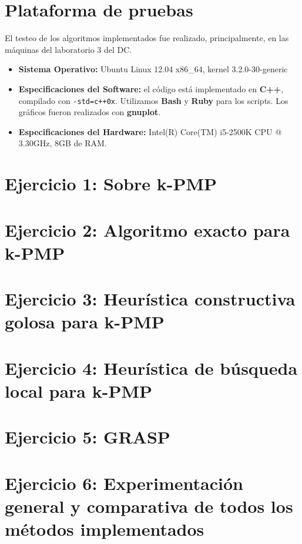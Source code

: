 \documentclass[a4paper]{article}
\begin{document}
\newpage
\section{Plataforma de pruebas}
El testeo de los algoritmos implementados fue realizado, principalmente, en las máquinas del laboratorio 3 del DC. \newline
\begin{itemize}
  \item \textbf{Sistema Operativo:} Ubuntu Linux 12.04 x86_64, kernel 3.2.0-30-generic

  \item \textbf{Especificaciones del Software:} el código está implementado en \textbf{C++}, compilado con \verb|-std=c++0x|.
  Utilizamos \textbf{Bash} y \textbf{Ruby} para los scripts. Los gráficos fueron realizados con \textbf{gnuplot}.

  \item \textbf{Especificaciones del Hardware:} Intel(R) Core(TM) i5-2500K CPU @ 3.30GHz, 8GB de RAM.
\end{itemize}



\newpage
\section{Ejercicio 1: Sobre k-PMP}


\newpage
\section{Ejercicio 2: Algoritmo exacto para k-PMP}


\newpage
\section{Ejercicio 3: Heurística constructiva golosa para k-PMP}


\newpage
\section{Ejercicio 4: Heurística de búsqueda local para k-PMP}


\newpage
\section{Ejercicio 5: GRASP}


\newpage
\section{Ejercicio 6: Experimentación general y comparativa de todos los
         métodos implementados}







\end{document}
